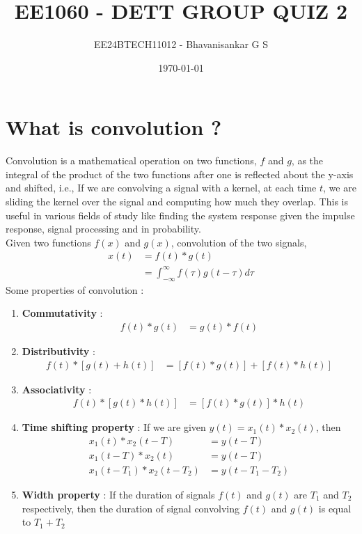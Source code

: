 \documentclass[12pt]{article}
\title{\textbf{EE1060 - DETT GROUP QUIZ 2}}
\author{EE24BTECH11012 - Bhavanisankar G S}
\date{\today}
\begin{document}
\maketitle
\thispagestyle{empty} %

\newpage
\tableofcontents
\newpage

\section{\textbf{What is convolution ?}}

Convolution is a mathematical operation on two functions, $f$ and $g$, as the integral of the product of the two functions after one is reflected about the y-axis and shifted, i.e., If we are convolving a signal with a kernel, at each time $t$, we are sliding the kernel over the signal and computing how much they overlap. This is useful in various fields of study like finding the system response given the impulse response, signal processing and in probability.\\
Given two functions $f(x)$ and $g(x)$, convolution of the two signals, \\
\begin{align}
	x(t) &= f(t) * g(t) \\
	     &= \int_{-\infty}^{\infty} f(\tau) g(t - \tau) d \tau \label{eq:conv}
\end{align}
Some properties of convolution : \\
\begin{enumerate}
\item \textbf{Commutativity} : 
\begin{align*}
f(t) * g(t) &= g(t) * f(t)
\end{align*}
\item \textbf{Distributivity} :
\begin{align*}
f(t) * [g(t) + h(t)] &= [f(t) * g(t)] + [f(t) * h(t)] 
\end{align*}
\item \textbf{Associativity} :
\begin{align*}
f(t) * [g(t) * h(t)] &= [f(t) * g(t)] * h(t)
\end{align*}
\item \textbf{Time shifting property} :
If we are given $y(t) = x_1 (t) * x_2 (t)$, then
\begin{align*}
	x_1(t) * x_2(t - T) &= y(t - T) \\
	x_1(t - T) * x_2(t) &= y(t - T) \\
	x_1(t - T_1) * x_2(t - T_2) &= y(t - T_1 - T_2)
\end{align*}
\item \textbf{Width property} :
If the duration of signals $f(t)$ and $g(t)$ are $T_1$ and $T_2$ respectively, then the duration of signal convolving $f(t)$ and $g(t)$ is equal to $T_1 + T_2$
\end{enumerate}
\end{document}
